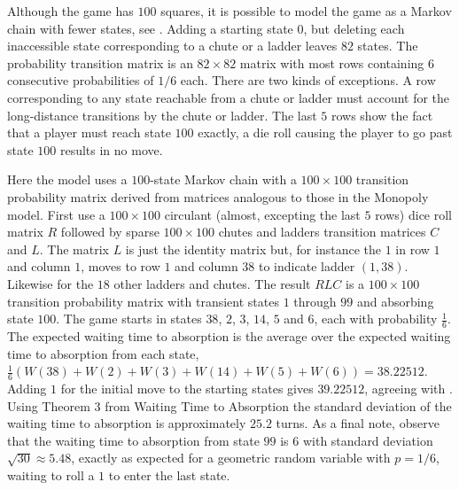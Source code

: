 \documentclass[12pt]{article}
\begin{document}
Although the game has \( 100 \) squares, it is possible to model the
game as a Markov chain with fewer states, see
\cite{althoen93}.  Adding a starting state \( 0 \), but deleting each
inaccessible state corresponding to a chute or a ladder leaves \( 82 \)
states.  The probability transition matrix is an \( 82 \times 82 \)
matrix with most rows containing \( 6 \) consecutive probabilities of \(
1/6 \) each.  There are two kinds of exceptions.  A row corresponding to
any state reachable from a chute or ladder must account for the
long-distance transitions by the chute or ladder.  The last \( 5 \) rows
show the fact that a player must reach state \( 100 \) exactly, a die
roll causing the player to go past state \( 100 \) results in no move.

Here the model uses a \( 100 \)-state Markov chain with a \( 100 \times
100 \) transition probability matrix derived from matrices analogous to
those in the Monopoly model.  First use a \( 100 \times 100 \) circulant
(almost, excepting the last \( 5 \) rows) dice roll matrix \( R \)
followed by sparse \( 100 \times 100 \) chutes and ladders transition
matrices \( C \) and \( L \).  The matrix \( L \) is just the identity
matrix but, for instance the \( 1 \) in row \( 1 \) and column \( 1 \),
moves to row \( 1 \) and column \( 38 \) to indicate ladder \( (1,38) \).
Likewise for the \( 18 \) other ladders and chutes.  The result \( RLC \)
is a \( 100 \times 100 \) transition probability matrix with transient
states \( 1 \) through \( 99 \) and absorbing state \( 100 \).  The game
starts in states \( 38 \), \( 2 \), \( 3 \), \( 14 \), \( 5 \) and \( 6 \),
each with probability \( \frac{1} {6} \).  The expected waiting time to
absorption is the average over the expected waiting time to absorption
from each state, \( \frac{1}{6}\left( W(38) + W(2) + W(3) + W(14) + W(5)
+ W(6) \right) = 38.22512 \).  Adding \( 1 \) for the initial move to
the starting states gives \( 39.22512 \), agreeing with
\cite{althoen93}.  Using Theorem 3 from 
{Waiting Time to Absorption} the standard deviation of the waiting time
to absorption is approximately \( 25.2 \) turns.  As a final note,
observe that the waiting time to absorption from state \( 99 \) is \( 6 \)
with standard deviation \( \sqrt{30} \approx 5.48 \), exactly as
expected for a geometric random variable with \( p=1/6 \), waiting to
roll a \( 1 \) to enter the last state.~%
\end{document}
